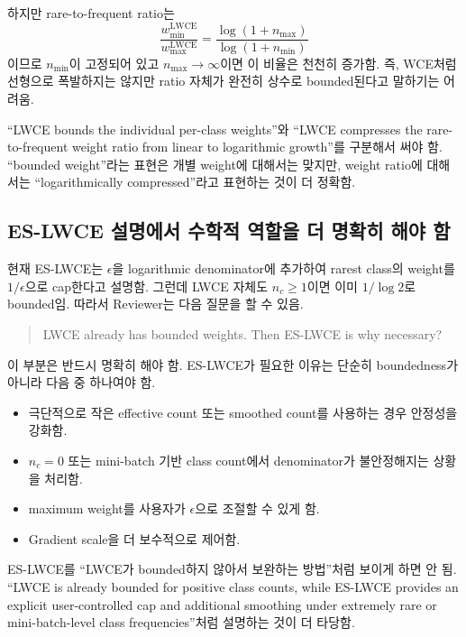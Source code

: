 \documentclass[11pt,a4paper]{article}
\begin{document}
하지만 rare-to-frequent ratio는
\begin{equation}
\frac{w_{\min}^{\mathrm{LWCE}}}{w_{\max}^{\mathrm{LWCE}}}
= \frac{\log(1+n_{\max})}{\log(1+n_{\min})}
\end{equation}
이므로 \(n_{\min}\)이 고정되어 있고 \(n_{\max}\to\infty\)이면 이 비율은 천천히 증가함. 즉, WCE처럼 선형으로 폭발하지는 않지만 ratio 자체가 완전히 상수로 bounded된다고 말하기는 어려움.

\begin{tcolorbox}[title=수정 권장]
``LWCE bounds the individual per-class weights''와 ``LWCE compresses the rare-to-frequent weight ratio from linear to logarithmic growth''를 구분해서 써야 함. ``bounded weight''라는 표현은 개별 weight에 대해서는 맞지만, weight ratio에 대해서는 ``logarithmically compressed''라고 표현하는 것이 더 정확함.
\end{tcolorbox}

\subsection{ES-LWCE 설명에서 수학적 역할을 더 명확히 해야 함}

현재 ES-LWCE는 \(\epsilon\)을 logarithmic denominator에 추가하여 rarest class의 weight를 \(1/\epsilon\)으로 cap한다고 설명함. 그런데 LWCE 자체도 \(n_c\geq1\)이면 이미 \(1/\log 2\)로 bounded임. 따라서 Reviewer는 다음 질문을 할 수 있음.

\begin{quote}
LWCE already has bounded weights. Then ES-LWCE is why necessary?
\end{quote}

이 부분은 반드시 명확히 해야 함. ES-LWCE가 필요한 이유는 단순히 boundedness가 아니라 다음 중 하나여야 함.

\begin{itemize}
\item 극단적으로 작은 effective count 또는 smoothed count를 사용하는 경우 안정성을 강화함.
\item \(n_c=0\) 또는 mini-batch 기반 class count에서 denominator가 불안정해지는 상황을 처리함.
\item maximum weight를 사용자가 \(\epsilon\)으로 조절할 수 있게 함.
\item Gradient scale을 더 보수적으로 제어함.
\end{itemize}

\begin{tcolorbox}[title=수정 권장]
ES-LWCE를 ``LWCE가 bounded하지 않아서 보완하는 방법''처럼 보이게 하면 안 됨. ``LWCE is already bounded for positive class counts, while ES-LWCE provides an explicit user-controlled cap and additional smoothing under extremely rare or mini-batch-level class frequencies''처럼 설명하는 것이 더 타당함.
\end{tcolorbox}
\end{document}

